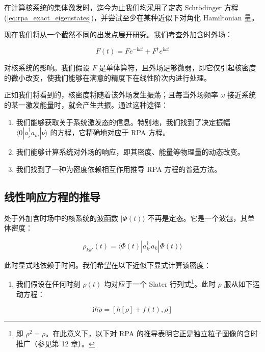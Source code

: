 在计算核系统的集体激发时，迄今为止我们均采用了定态 Schrödinger 方程 (\ref{eq:rpa_exact_eigenstates})，并尝试至少在某种近似下对角化
Hamiltonian 量。

现在我们将从一个截然不同的出发点展开研究。我们考查外加含时外场：

\begin{equation}
F(t)=Fe^{-\mathrm{i}\omega t}+F^{\dagger}e^{\mathrm{i}\omega t}\label{eq:linresp_external_field}
\end{equation}

对核系统的影响。我们假设 $F$ 是单体算符，且外场足够微弱，即它仅引起核密度的微小改变，使我们能够在满意的精度下在线性阶次内进行处理。

正如我们将看到的，核密度将随着该外场发生振荡；且每当外场频率 $\omega$ 接近系统的某一激发能量时，就会产生共振。通过这种途径：
\begin{enumerate}
\item 我们能够获取关于系统激发态的信息。特别地，我们找到了决定振幅 $\langle0|a^{\dagger}_{i}a_{m}|\nu\rangle$
的方程，它精确地对应于 RPA 方程。
\item 我们能够计算系统对外场的响应，即其密度、能量等物理量的动态改变。
\item 我们找到了一种为密度依赖相互作用推导 RPA 方程的普适方法。
\end{enumerate}

\subsection{线性响应方程的推导\label{subsec:8.5.1_=007EBF=006027=0054CD=005E94=0065B9=007A0B=007684=0063A8=005BFC}}

处于外加含时场中的核系统的波函数 $|\Phi(t)\rangle$ 不再是定态。它是一个波包，其单体密度：

\begin{equation}
\rho_{kk'}(t)=\langle\Phi(t)|a^{\dagger}_{k'}a_{k}|\Phi(t)\rangle\label{eq:linresp_density_matrix_def}
\end{equation}

此时显式地依赖于时间。我们希望在以下近似下显式计算该密度：
\begin{enumerate}
\item 我们假设在任何时刻 $\rho(t)$ 均对应于一个 Slater 行列式\footnote{即 $\rho^{2}=\rho$。在此意义下，以下对 RPA 的推导表明它正是独立粒子图像的含时推广（参见第 12 章）。}。此时
$\rho$ 服从如下运动方程：
\end{enumerate}
\begin{equation}
\mathrm{i}\hbar\dot{\rho}=[h[\rho]+f(t),\rho]\label{eq:linresp_tdhf_eom}
\end{equation}

